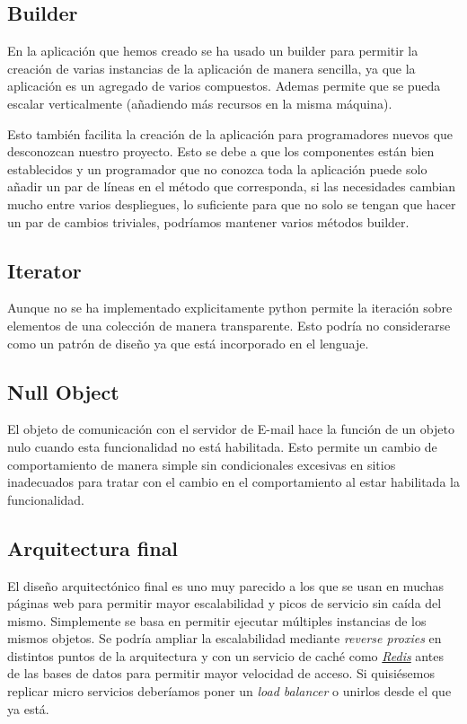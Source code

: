 \subsection{Builder}

En la aplicación que hemos creado se ha usado un builder para permitir la creación de varias instancias de la aplicación de manera sencilla, ya que la aplicación es un agregado de varios compuestos. Ademas permite que se pueda escalar verticalmente (añadiendo más recursos en la misma máquina).

Esto también facilita la creación de la aplicación para programadores nuevos que desconozcan nuestro proyecto. Esto se debe a que los componentes están bien establecidos y un programador que no conozca toda la aplicación puede solo añadir un par de líneas en el método que corresponda, si las necesidades cambian mucho entre varios despliegues, lo suficiente para que no solo se tengan que hacer un par de cambios triviales, podríamos mantener varios métodos builder.


\subsection{Iterator}
Aunque no se ha implementado explicitamente python permite la iteración sobre elementos de una colección de manera transparente. Esto podría no considerarse como un patrón de diseño ya que está incorporado en el lenguaje.


\subsection{Null Object}
El objeto de comunicación con el servidor de E-mail hace la función de un objeto nulo cuando esta funcionalidad no está habilitada. Esto permite un cambio de comportamiento de manera simple sin condicionales excesivas en sitios inadecuados para tratar con el cambio en el comportamiento al estar habilitada la funcionalidad.


\subsection{Arquitectura final}

El diseño arquitectónico final es uno muy parecido a los que se usan en muchas páginas web para permitir mayor escalabilidad y picos de servicio sin caída del mismo. Simplemente se basa en permitir ejecutar múltiples instancias de los mismos objetos. Se podría ampliar la escalabilidad mediante \emph{reverse proxies} en distintos puntos de la arquitectura y con un servicio de caché como \href{https://redis.io/}{\emph{Redis}} antes de las bases de datos para permitir mayor velocidad de acceso. Si quisiésemos replicar micro servicios deberíamos poner un \emph{load balancer} o unirlos desde el que ya está.


